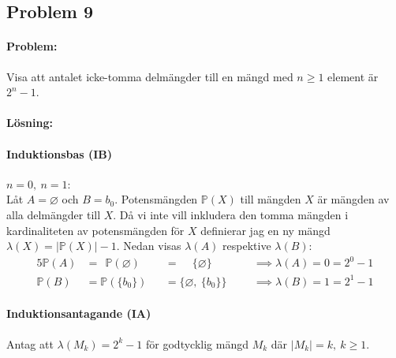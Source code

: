 \subsection*{Problem 9}

\paragraph{Problem:} Visa att antalet icke-tomma delmängder till en mängd med \newline$n\ge 1$ element är $2^n-1$.

\paragraph{Lösning:}
\paragraph{Induktionsbas (IB)} $n=0,\ n=1$:\\
Låt $A=\varnothing$ och $B={b_0}$. Potensmängden $\mathbb{P}(X)$ till mängden $X$ är mängden av alla delmängder till $X$. Då vi inte vill inkludera den tomma mängden i kardinaliteten av potensmängden för $X$ definierar jag en ny mängd $\lambda(X)=|\mathbb{P}(X)|-1$. Nedan visas $\lambda(A)$ respektive $\lambda(B)$:
\begin{alignat*}{5}
\mathbb{P}(A) &= \ \: \mathbb{P}(\varnothing) &&= \quad \, \{\varnothing\} &&&\implies \lambda(A) = 0 = 2^0-1\\
\mathbb{P}(B) &= \mathbb{P}(\{b_0\}) &&= \{\varnothing,\ \{b_0\}\} &&&\implies \lambda(B) = 1 = 2^1-1
\end{alignat*}

\paragraph{Induktionsantagande (IA)} Antag att $\lambda(M_k)=2^k-1$ för godtycklig mängd $M_k$ där $|M_k|=k,\ k\ge 1$. 


